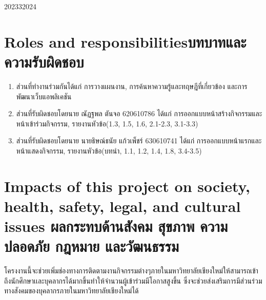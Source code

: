 \begin{plan}{6}{2023}{3}{2024}

\end{plan}

\section{\ifenglish Roles and responsibilities\else บทบาทและความรับผิดชอบ\fi}
\begin{enumerate}
    \item ส่วนที่ทำงานร่วมกันได้แก่ การวางแผนงาน, การค้นหาความรู้และทฤษฎีที่เกี่ยวข้อง และการพัฒนาเว็บแอพลิเคชัน
    \item ส่วนที่รับผิดชอบโดยนาย ณัฏฐพล ตันจอ 620610786 ได้แก่ การออกแบบหน้าสร้างกิจกรรมและหน้าเข้าร่วมกิจกรรม, รายงานหัวข้อ(1.3, 1.5, 1.6, 2.1-2.3, 3.1-3.3) 
    \item ส่วนที่รับผิดชอบโดยนาย นายธิษณ์ธนัย แก้วเพ็ชร์ 630610741 ได้แก่ การออกแบบหน้าแรกและหน้าแสดงกิจกรรม, รายงานหัวข้อ(บทนำ, 1.1, 1.2, 1.4, 1.8, 3.4-3.5)
\end{enumerate}

\section{\ifenglish%
Impacts of this project on society, health, safety, legal, and cultural issues
\else%
ผลกระทบด้านสังคม สุขภาพ ความปลอดภัย กฎหมาย และวัฒนธรรม
\fi}

โครงงานนี้จะช่วยเพิ่มช่องทางการติดตามงานกิจกรรมต่างๆภายในมหาวิทยาลัยเชียงใหม่ให้สามารถเข้าถึงนักศึกษาเเละบุคลากรได้มากขึ้นทำให้จำนวนผู้เข้าร่วมมีโอกาสสูงขึ้น ซึ่งจะช่วยส่งเสริมการมีส่วนร่วมทางสังคมของบุคลากรภายในมหาวิทยาลัยเชียงใหม่ได้
